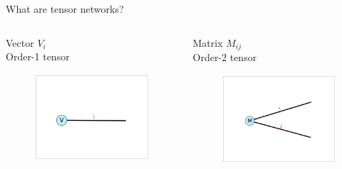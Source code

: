 \begin{frame}{What are tensor networks?}

\begin{columns}

  \begin{column}[T]{0.33\textwidth}
    \centering
    Vector $V_i$ \\
    Order-1 tensor
    \begin{figure}[T]
      \includegraphics[width=1.0\textwidth]{
        slides/assets/what-are-tensor-networks-tensor-order-1.jpg
      }
    \end{figure}
  \end{column}

  \begin{column}[T]{0.33\textwidth}
    \centering
    Matrix $M_{ij}$ \\
    Order-2 tensor
    \begin{figure}[T]
      \includegraphics[width=1.0\textwidth]{
        slides/assets/what-are-tensor-networks-tensor-order-2.jpg
      }
    \end{figure}
  \end{column}


\end{columns}
\end{frame}
